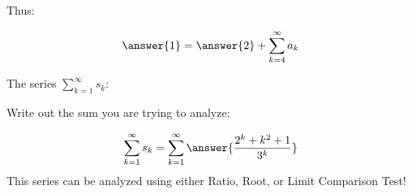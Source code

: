 \documentclass{ximera}
\begin{document}
\begin{exercise}
\begin{exercise}
\begin{exercise}
\begin{exercise}
Thus:

\[
\answer{1} = \answer{2} + \sum_{k=4}^{\infty} a_k
\]
\begin{exercise}
The series $\sum_{k=1}^{\infty} s_k$: 

\begin{multipleChoice}
\end{multipleChoice}

\begin{hint}
Write out the sum you are trying to analyze:

\[
\sum_{k=1}^{\infty} s_k = \sum_{k=1}^{\infty} \answer{\frac{2^k+k^2+1}{3^k}}
\]
This series can be analyzed using either Ratio, Root, or Limit Comparison Test!

\end{hint}
\end{exercise}
\end{exercise}
\end{exercise}
\end{exercise}
\end{exercise}
\end{document}
